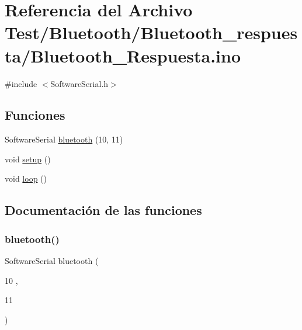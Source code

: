 \hypertarget{_bluetooth___respuesta_8ino}{}\section{Referencia del Archivo Test/\+Bluetooth/\+Bluetooth\+\_\+respuesta/\+Bluetooth\+\_\+\+Respuesta.ino}
\label{_bluetooth___respuesta_8ino}
{\ttfamily \#include $<$Software\+Serial.\+h$>$}\newline
\subsection*{Funciones}
\begin{DoxyCompactItemize}
\item 
Software\+Serial \hyperlink{_bluetooth___respuesta_8ino_a2e70a7fdaa23751d09e00821518e2e8e}{bluetooth} (10, 11)
\item 
void \hyperlink{_bluetooth___respuesta_8ino_a4fc01d736fe50cf5b977f755b675f11d}{setup} ()
\item 
void \hyperlink{_bluetooth___respuesta_8ino_afe461d27b9c48d5921c00d521181f12f}{loop} ()
\end{DoxyCompactItemize}


\subsection{Documentación de las funciones}
\mbox{\label{_bluetooth___respuesta_8ino_a2e70a7fdaa23751d09e00821518e2e8e}} 
\subsubsection{\texorpdfstring{bluetooth()}{bluetooth()}}
{\footnotesize\ttfamily Software\+Serial bluetooth (\begin{DoxyParamCaption}\item[{10}]{,  }\item[{11}]{ }\end{DoxyParamCaption})}

\mbox{\label{_bluetooth___respuesta_8ino_afe461d27b9c48d5921c00d521181f12f}} 
